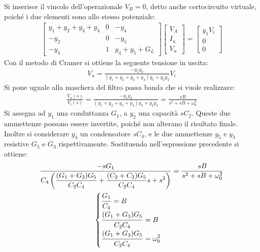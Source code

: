 \documentclass{article}
\numberwithin{equation}{subsection}
\begin{document}
Si inserisce il vincolo dell'operazionale $V_B=0$, detto anche cortocircuito virtuale, poiché i due elementi sono allo stesso potenziale: 
\begin{gather*}
    \begin{bmatrix}
        y_1+y_2+y_3+y_4&0&-y_4\\
        -y_2&0&-y_5\\
        -y_4&1&y_4+y_5+G_L
    \end{bmatrix}\begin{bmatrix}
        V_A\\I_u\\V_u
    \end{bmatrix}=\begin{bmatrix}
        y_1V_i\\0\\0
    \end{bmatrix}
\end{gather*}
Con il metodo di Cramer si ottiene la seguente tensione in uscita:
\begin{gather*}
    V_u=\displaystyle\frac{-y_1y_2}{(y_1+y_2+y_3+y_4)y_5+y_2y_4}V_i
\end{gather*}
Si pone uguale alla maschera del filtro passa banda che si vuole realizzare:
\begin{gather*}
    \displaystyle\frac{V_u(s)}{V_i(s)}=\frac{-y_1y_2}{(y_1+y_2+y_3+y_4)y_5+y_2y_4}=\frac{sB}{s^2+sB+\omega_0^2}
\end{gather*}
Si assegna ad $y_1$ una conduttanza $G_1$, a $y_2$ una capacità $sC_2$. Queste due ammettenze possono essere invertite, poiché non alterano 
il risultato finale. 
Inoltre si considerare $y_4$ un condensatore $sC_4$, e le due ammettenze $y_5$ e $y_3$ resistive $G_5$ e $G_3$ rispettivamente. 
Sostituendo nell'espressione precedente si ottiene:
\begin{gather*}
    \displaystyle\frac{-sG_1}{C_4\left(\displaystyle\frac{(G_1+G_3)G_5}{C_2C_4}+\frac{(C_2+C_3)G_5}{C_2C_4}s+s^2\right)}=\frac{sB}{s^2+sB+\omega_0^2}\\
    \begin{cases}
        \displaystyle\frac{\strut G_1}{\strut C_4}=B\\
        \displaystyle\frac{\strut (G_1+G_3)G_5}{\strut C_2C_4}=B\\
        \displaystyle\frac{\strut (G_1+G_3)G_5}{\strut C_2C_4}=\omega_0^2
    \end{cases}
\end{gather*}
\end{document}
